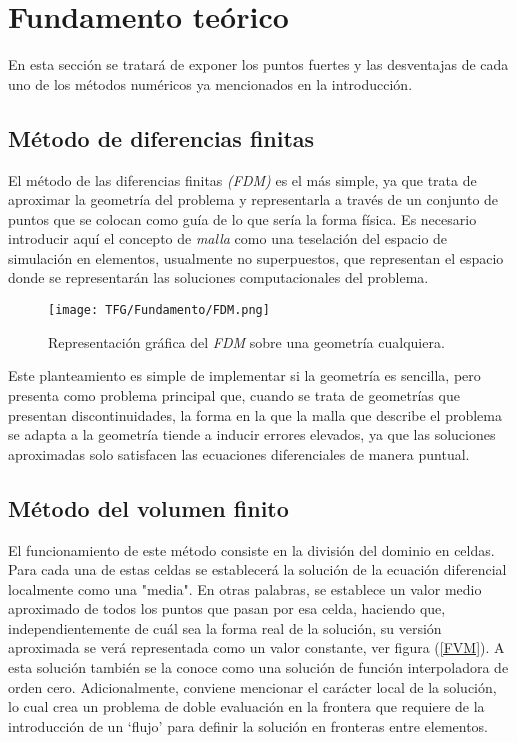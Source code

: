 \documentclass[11pt,a4paper,twoside,pdf]{article}
\numberwithin{equation}{section}
\begin{document}
\section{Fundamento teórico}
En esta sección se tratará de exponer los puntos fuertes y las desventajas de cada uno de los métodos numéricos ya mencionados en la introducción.
\subsection{Método de diferencias finitas}
El método de las diferencias finitas \textit{(FDM)} es el más simple, ya que trata de aproximar la geometría del problema y representarla a través de un conjunto de puntos que se colocan como guía de lo que sería la forma física. Es necesario introducir aquí el concepto de \textit{malla} como una teselación del espacio de simulación en elementos, usualmente no superpuestos, que representan el espacio donde se representarán las soluciones computacionales del problema.

\begin{figure}[h]
\centering
\texttt{[image: TFG/Fundamento/FDM.png]}				
\caption{Representación gráfica del \textit{FDM} sobre una geometría cualquiera.}
\end{figure}
\noindent
Este planteamiento es simple de implementar si la geometría es sencilla, pero presenta como problema principal que, cuando se trata de geometrías que presentan discontinuidades, la forma en la que la malla que describe el problema se adapta a la geometría tiende a inducir errores elevados, ya que las soluciones aproximadas solo satisfacen las ecuaciones diferenciales de manera puntual.
\subsection{Método del volumen finito}
El funcionamiento de este método consiste en la división del dominio en celdas. Para cada una de estas celdas se establecerá la solución de la ecuación diferencial localmente como una "media". En otras palabras, se establece un valor medio aproximado de todos los puntos que pasan por esa celda, haciendo que, independientemente de cuál sea la forma real de la solución, su versión aproximada se verá representada como un valor constante, ver figura (\ref{FVM}). A esta solución también se la conoce como una solución de función interpoladora de orden cero. Adicionalmente, conviene mencionar el carácter local de la solución, lo cual crea un problema de doble evaluación en la frontera que requiere de la introducción de un `flujo' para definir la solución en fronteras entre elementos.
\end{document}
